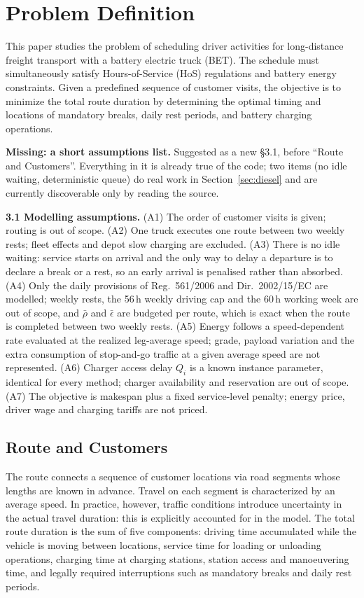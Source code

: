 \section{Problem Definition}
\label{sec:problem_definition}

This paper studies the problem of scheduling driver activities for long-distance freight transport with a battery electric truck (BET). The schedule must simultaneously satisfy Hours-of-Service (HoS) regulations and battery energy constraints. Given a predefined sequence of customer visits, the objective is to minimize the total route duration by determining the optimal timing and locations of mandatory breaks, daily rest periods, and battery charging operations.

\begin{anew}
\textbf{Missing: a short assumptions list.} Suggested as a new \S3.1, before
``Route and Customers''. Everything in it is already true of the code; two items
(no idle waiting, deterministic queue) do real work in Section~\ref{sec:diesel}
and are currently discoverable only by reading the source.

\medskip
\noindent\textbf{3.1 Modelling assumptions.}
(A1) The order of customer visits is given; routing is out of scope.
(A2) One truck executes one route between two weekly rests; fleet effects and
depot slow charging are excluded.
(A3) There is no idle waiting: service starts on arrival and the only way to
delay a departure is to declare a break or a rest, so an early arrival is
penalised rather than absorbed.
(A4) Only the daily provisions of Reg.~561/2006 and Dir.~2002/15/EC are modelled;
weekly rests, the 56\,h weekly driving cap and the 60\,h working week are out of
scope, and $\bar\rho$ and $\bar\epsilon$ are budgeted per route, which is exact
when the route is completed between two weekly rests.
(A5) Energy follows a speed-dependent rate evaluated at the realized leg-average
speed; grade, payload variation and the extra consumption of stop-and-go traffic
at a given average speed are not represented.
(A6) Charger access delay $Q_i$ is a known instance parameter, identical for
every method; charger availability and reservation are out of scope.
(A7) The objective is makespan plus a fixed service-level penalty; energy price,
driver wage and charging tariffs are not priced.
\end{anew}

\subsection{Route and Customers}
The route connects a sequence of customer locations via road segments whose lengths are known in advance. Travel on each segment is characterized by an average speed. In practice, however, traffic conditions introduce uncertainty in the actual travel duration: this is explicitly accounted for in the model. The total route duration is the sum of five components: driving time accumulated while the vehicle is moving between locations, service time for loading or unloading operations, charging time at charging stations, station access and manoeuvering time, and legally required interruptions such as mandatory breaks and daily rest periods.

